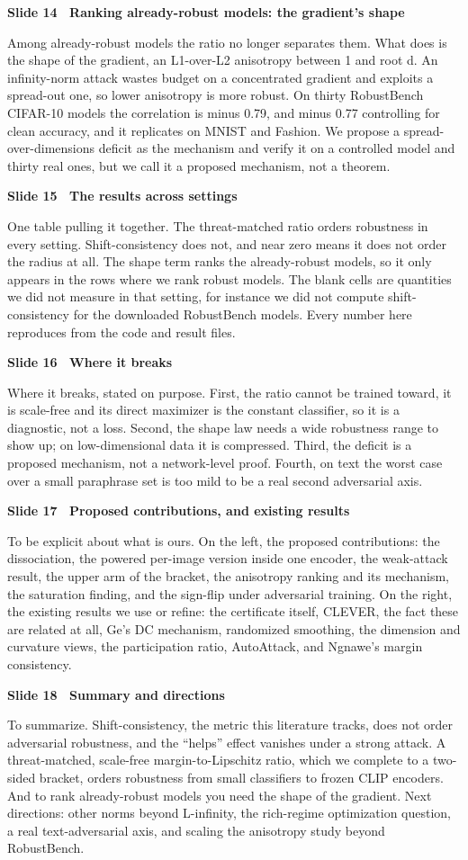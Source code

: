 \documentclass[11pt]{article}
\newcommand{\slide}[3]{%
  \par\vspace{0.9em}%
  {\color{TUMblue}\bfseries Slide #1 \textbullet\ #2}\par
  \vspace{0.25em}#3\par}
\begin{document}
\slide{14}{Ranking already-robust models: the gradient's shape}{%
Among already-robust models the ratio no longer separates them. What does is the shape of the
gradient, an L1-over-L2 anisotropy between 1 and root d. An infinity-norm attack wastes budget on a
concentrated gradient and exploits a spread-out one, so lower anisotropy is more robust. On thirty
RobustBench CIFAR-10 models the correlation is minus 0.79, and minus 0.77 controlling for clean
accuracy, and it replicates on MNIST and Fashion. We propose a spread-over-dimensions deficit as the
mechanism and verify it on a controlled model and thirty real ones, but we call it a proposed
mechanism, not a theorem.}

\slide{15}{The results across settings}{%
One table pulling it together. The threat-matched ratio orders robustness in every setting.
Shift-consistency does not, and near zero means it does not order the radius at all. The shape term
ranks the already-robust models, so it only appears in the rows where we rank robust models. The blank
cells are quantities we did not measure in that setting, for instance we did not compute
shift-consistency for the downloaded RobustBench models. Every number here reproduces from the code
and result files.}

\slide{16}{Where it breaks}{%
Where it breaks, stated on purpose. First, the ratio cannot be trained toward, it is scale-free and
its direct maximizer is the constant classifier, so it is a diagnostic, not a loss. Second, the shape
law needs a wide robustness range to show up; on low-dimensional data it is compressed. Third, the
deficit is a proposed mechanism, not a network-level proof. Fourth, on text the worst case over a
small paraphrase set is too mild to be a real second adversarial axis.}

\slide{17}{Proposed contributions, and existing results}{%
To be explicit about what is ours. On the left, the proposed contributions: the dissociation, the
powered per-image version inside one encoder, the weak-attack result, the upper arm of the bracket,
the anisotropy ranking and its mechanism, the saturation finding, and the sign-flip under adversarial
training. On the right, the existing results we use or refine: the certificate itself, CLEVER, the
fact these are related at all, Ge's DC mechanism, randomized smoothing, the dimension and curvature
views, the participation ratio, AutoAttack, and Ngnawe's margin consistency.}

\slide{18}{Summary and directions}{%
To summarize. Shift-consistency, the metric this literature tracks, does not order adversarial
robustness, and the ``helps'' effect vanishes under a strong attack. A threat-matched, scale-free
margin-to-Lipschitz ratio, which we complete to a two-sided bracket, orders robustness from small
classifiers to frozen CLIP encoders. And to rank already-robust models you need the shape of the
gradient. Next directions: other norms beyond L-infinity, the rich-regime optimization question, a
real text-adversarial axis, and scaling the anisotropy study beyond RobustBench.}
\end{document}
